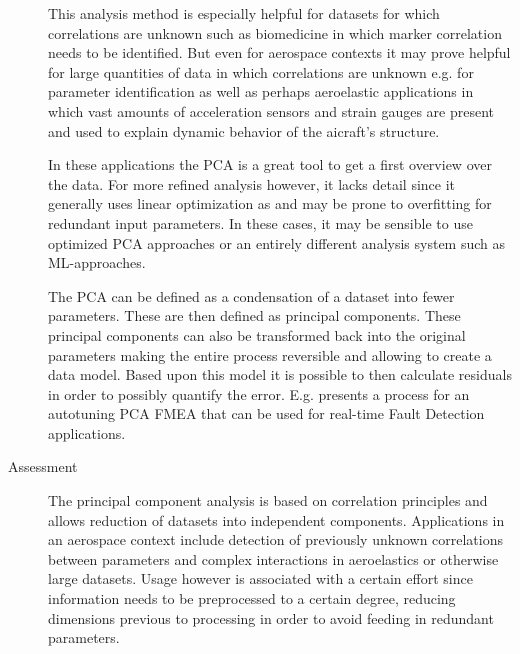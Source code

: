 \begin{description}
    This analysis method is especially helpful for datasets for which correlations are unknown such as biomedicine in which marker correlation needs to be identified. But even for aerospace contexts it may prove helpful for large quantities of data in which correlations are unknown e.g. for parameter identification as well as perhaps aeroelastic applications in which vast amounts of acceleration sensors and strain gauges are present and used to explain dynamic behavior of the aicraft's structure.

    In these applications the PCA is a great tool to get a first overview over the data. For more refined analysis however, it lacks detail since it generally uses linear optimization as and may be prone to overfitting for redundant input parameters. In these cases, it may be sensible to use optimized PCA approaches or an entirely different analysis system such as ML-approaches.

    The PCA can be defined as a condensation of a dataset into fewer parameters. These are then defined as principal components. These principal components can also be transformed back into the original parameters making the entire process reversible and allowing to create a data model. Based upon this model it is possible to then calculate residuals in order to possibly quantify the error. E.g. \textcite{isermann_fault-diagnosis_2006} presents a process for an autotuning PCA FMEA that can be used for real-time Fault Detection applications.

    \item[Assessment]\hfill


    The principal component analysis is based on correlation principles and allows reduction of datasets into independent components. Applications in an aerospace context include detection of previously unknown correlations between parameters and complex interactions in aeroelastics or otherwise large datasets. Usage however is associated with a certain effort since information needs to be preprocessed to a certain degree, reducing dimensions previous to processing in order to avoid feeding in redundant parameters.





\end{description}

